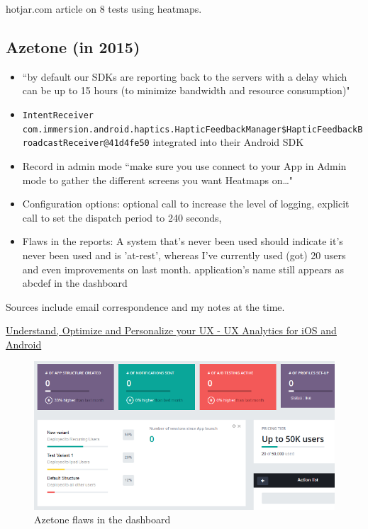 hotjar.com article on 8 tests using heatmaps.

\subsection{Azetone (in 2015)}
\begin{itemize}
    \item ``by default our SDKs are reporting back to the servers with a delay which can be up to 15 hours (to minimize bandwidth and resource consumption)"
    \item  \texttt{IntentReceiver com.immersion.android.haptics.HapticFeedbackManager\$HapticFeedbackBroadcastReceiver@41d4fe50} integrated into their Android SDK
    \item Record in admin mode ``make sure you use connect to your App in Admin mode to gather the different screens you want Heatmaps on…"
    \item Configuration options: optional call to increase the level of logging, explicit call to set the dispatch period to 240 seconds,
    \item Flaws in the reports: A system that's never been used should indicate it's never been used and is 'at-rest', whereas I've currently used (got) 20 users and even improvements on last month. application's name still appears as abcdef in the dashboard
\end{itemize}
Sources include email correspondence and my notes at the time.

\href{https://www.azetone.com/mobile-ux-analytics/}{Understand, Optimize and Personalize your UX - UX Analytics for iOS and Android}

\begin{figure}
    \centering
    \includegraphics[width=16cm]{images/azetone/azetone_dashboard_flaws_for_kiwix_2015.png}
    \caption{Azetone flaws in the dashboard}
    \label{fig:azetone_dashboard_flaws_for_kiwix_2015}
\end{figure}



